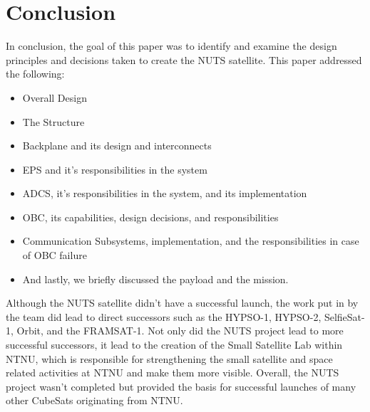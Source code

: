 \documentclass[12pt, a4paper]{report}
\begin{document}
\section{Conclusion}

In conclusion, the goal of this paper was to identify and examine the design principles and decisions taken to create the NUTS satellite. This paper addressed the following:

\begin{itemize}
    \item Overall Design
    \item The Structure
    \item Backplane and its design and interconnects
    \item EPS and it's responsibilities in the system
    \item ADCS, it's responsibilities in the system, and its implementation
    \item OBC, its capabilities, design decisions, and responsibilities
    \item Communication Subsystems, implementation, and the responsibilities in case of OBC failure
    \item And lastly, we briefly discussed the payload and the mission.
\end{itemize}

Although the NUTS satellite didn't have a successful launch, the work put in by the team did lead to direct successors such as the HYPSO-1, HYPSO-2, SelfieSat-1, Orbit, and the FRAMSAT-1. Not only did the NUTS project lead to more successful successors, it lead to the creation of the Small Satellite Lab within NTNU, which is responsible for strengthening the small satellite and space related activities at NTNU and make them more visible. Overall, the NUTS project wasn't completed but provided the basis for successful launches of many other CubeSats originating from NTNU. 



\end{document}
